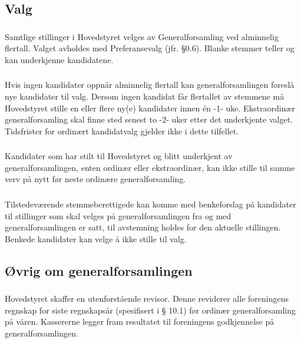 \subsection{Valg}
\subsubsection{}
Samtlige stillinger i Hovedstyret velges av Generalforsamling ved
alminnelig flertall. Valget avholdes med Preferansevalg (jfr. §0.6). Blanke
stemmer teller og kan underkjenne kandidatene.

\subsubsection{}
Hvis ingen kandidater oppnår alminnelig flertall kan generalforsamlingen
foreslå nye kandidater til valg. Dersom ingen
kandidat får flertallet av stemmene må Hovedstyret stille en eller flere ny(e)
kandidater innen én -1- uke. Ekstraordinær generalforsamling skal finne sted
senest to -2- uker etter det underkjente valget. Tidsfrister for ordinært
kandidatvalg gjelder ikke i dette tilfellet.

\subsubsection{}
Kandidater som har stilt til Hovedstyret og blitt underkjent av
generalforsamlingen, enten ordinær eller ekstraordinær, kan
ikke stille til samme verv på nytt før neste ordinære generalforsamling.

\subsubsection{}
Tilstedeværende stemmeberettigede kan komme med benkeforslag på kandidater til
stillinger som skal velges på generalforsamlingen fra og med
generalforsamlingen er satt, til avstemning holdes for den aktuelle stillingen.
Benkede kandidater kan velge å ikke stille til valg.

\subsection{Øvrig om generalforsamlingen}
\subsubsection{}
Hovedstyret skaffer en utenforstående revisor. Denne reviderer alle foreningens
regnskap for siste regnskapsår (spesifisert i § 10.1) før ordinær
generalforsamling på våren.  Kassererne legger fram resultatet til foreningens
godkjennelse på generalforsamlingen.

